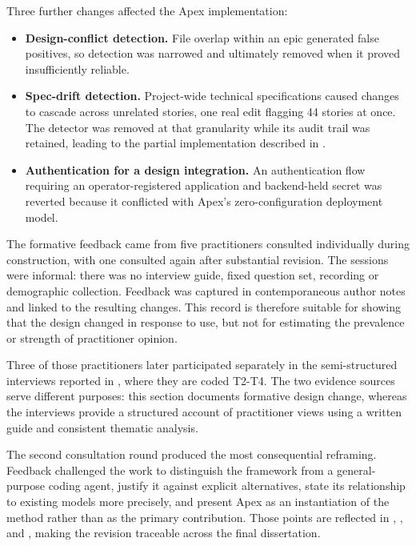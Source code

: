 \noindent Three further changes affected the Apex implementation:

\begin{itemize}[leftmargin=0.6cm, itemsep=0.4em]

\item \textbf{Design-conflict detection.} File overlap within an epic generated false positives, so detection was narrowed and ultimately removed when it proved insufficiently reliable.

\item \textbf{Spec-drift detection.} Project-wide technical specifications caused changes to cascade across unrelated stories, one real edit flagging 44 stories at once. The detector was removed at that granularity while its audit trail was retained, leading to the partial implementation described in .

\item \textbf{Authentication for a design integration.} An authentication flow requiring an operator-registered application and backend-held secret was reverted because it conflicted with Apex's zero-configuration deployment model.

\end{itemize}

The formative feedback came from five practitioners consulted individually during construction, with one consulted again after substantial revision. The sessions were informal: there was no interview guide, fixed question set, recording or demographic collection. Feedback was captured in contemporaneous author notes and linked to the resulting changes. This record is therefore suitable for showing that the design changed in response to use, but not for estimating the prevalence or strength of practitioner opinion.

Three of those practitioners later participated separately in the semi-structured interviews reported in , where they are coded T2-T4. The two evidence sources serve different purposes: this section documents formative design change, whereas the interviews provide a structured account of practitioner views using a written guide and consistent thematic analysis.

The second consultation round produced the most consequential reframing. Feedback challenged the work to distinguish the framework from a general-purpose coding agent, justify it against explicit alternatives, state its relationship to existing models more precisely, and present Apex as an instantiation of the method rather than as the primary contribution. Those points are reflected in , ,  and , making the revision traceable across the final dissertation.

